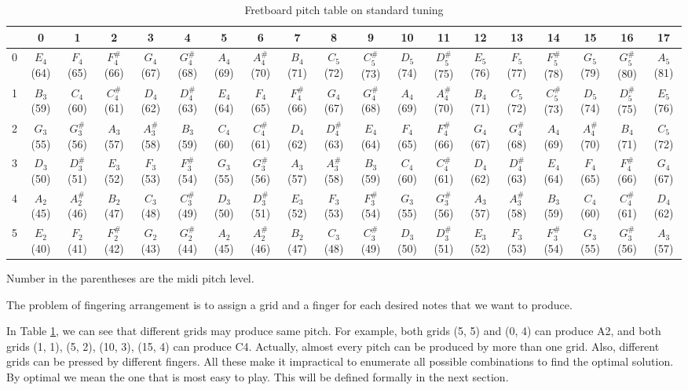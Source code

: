 \begin{table}
    \centering
    \tiny \tabcolsep=0.03cm
\begin{tabular*}{\textwidth}{r|c|c|c|c|c|c|c|c|c|c|c|c|c|c|c|c|c|c}
& 0& 1& 2& 3& 4& 5& 6& 7& 8& 9& 10& 11& 12& 13& 14& 15& 16& 17\\ \hline
0
& $E_4$(64)& $F_4$(65)& $F^\#_4$(66)& $G_4$(67)& $G^\#_4$(68)& $A_4$(69)& $A^\#_4$(70)& $B_4$(71)& $C_5$(72)& $C^\#_5$(73)& $D_5$(74)& $D^\#_5$(75)& $E_5$(76)& $F_5$(77)& $F^\#_5$(78)& $G_5$(79)& $G^\#_5$(80)& $A_5$(81)\\ \hline
1
& $B_3$(59)& $C_4$(60)& $C^\#_4$(61)& $D_4$(62)& $D^\#_4$(63)& $E_4$(64)& $F_4$(65)& $F^\#_4$(66)& $G_4$(67)& $G^\#_4$(68)& $A_4$(69)& $A^\#_4$(70)& $B_4$(71)& $C_5$(72)& $C^\#_5$(73)& $D_5$(74)& $D^\#_5$(75)& $E_5$(76)\\ \hline
2
& $G_3$(55)& $G^\#_3$(56)& $A_3$(57)& $A^\#_3$(58)& $B_3$(59)& $C_4$(60)& $C^\#_4$(61)& $D_4$(62)& $D^\#_4$(63)& $E_4$(64)& $F_4$(65)& $F^\#_4$(66)& $G_4$(67)& $G^\#_4$(68)& $A_4$(69)& $A^\#_4$(70)& $B_4$(71)& $C_5$(72)\\ \hline
3
& $D_3$(50)& $D^\#_3$(51)& $E_3$(52)& $F_3$(53)& $F^\#_3$(54)& $G_3$(55)& $G^\#_3$(56)& $A_3$(57)& $A^\#_3$(58)& $B_3$(59)& $C_4$(60)& $C^\#_4$(61)& $D_4$(62)& $D^\#_4$(63)& $E_4$(64)& $F_4$(65)& $F^\#_4$(66)& $G_4$(67)\\ \hline
4
& $A_2$(45)& $A^\#_2$(46)& $B_2$(47)& $C_3$(48)& $C^\#_3$(49)& $D_3$(50)& $D^\#_3$(51)& $E_3$(52)& $F_3$(53)& $F^\#_3$(54)& $G_3$(55)& $G^\#_3$(56)& $A_3$(57)& $A^\#_3$(58)& $B_3$(59)& $C_4$(60)& $C^\#_4$(61)& $D_4$(62)\\ \hline
5
& $E_2$(40)& $F_2$(41)& $F^\#_2$(42)& $G_2$(43)& $G^\#_2$(44)& $A_2$(45)& $A^\#_2$(46)& $B_2$(47)& $C_3$(48)& $C^\#_3$(49)& $D_3$(50)& $D^\#_3$(51)& $E_3$(52)& $F_3$(53)& $F^\#_3$(54)& $G_3$(55)& $G^\#_3$(56)& $A_3$(57)\\ \hline
\end{tabular*}
    \caption{Fretboard pitch table on standard tuning}
    \label{table:standard-tuning}
    \startdescription
    Number in the parentheses are the midi pitch level.
\end{table}

The problem of fingering arrangement is to assign a grid and a finger for each desired notes that we want to produce. 

In Table \ref{table:standard-tuning}, we can see that different grids may produce same pitch. For example, both grids (5, 5) and (0, 4) can produce A2, and both grids (1, 1), (5, 2), (10, 3), (15, 4) can produce C4. Actually, almost every pitch can be produced by more than one grid. Also, different grids can be pressed by different fingers. All these make it impractical to  enumerate all possible combinations to find the optimal solution. By optimal we mean the one that is most easy to play. This will be defined formally in the next section.

